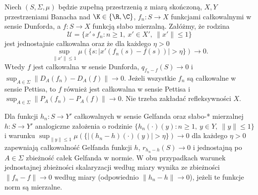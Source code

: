 \begin{twierdzenie}
\label{thm:uniform-vitali15b}
Niech $(S,\Sigma,\mu)$ będzie zupełną przestrzenią z miarą
skończoną, $X,Y$ przestrzeniami Banacha nad $\K\in\{\R,\C\}$,
$f_n:S\to X$ funkcjami całkowalnymi w sensie Dunforda,
a $f:S\to X$ funkcją słabo mierzalną. Załóżmy, że rodzina
\[
 \mathcal U=\{x'\circ f_n:n\ge1,\ x'\in X',\ \|x'\|\le1\}
\]
jest jednostajnie całkowalna oraz że dla każdego $\eta>0$
\[
 \sup_{\|x'\|\le1}
 \mu(\{s:|x'(f_n(s)-f(s))|>\eta\})\longrightarrow0.
\]
Wtedy $f$ jest całkowalna w sensie Dunforda,
$q_{f_n-f}(S)\to0$ i
$\sup_{A\in\Sigma}\|D_A(f_n)-D_A(f)\|\to0$.
Jeżeli wszystkie $f_n$ są całkowalne w sensie Pettisa,
to $f$ również jest całkowalna w sensie Pettisa i
$\sup_{A\in\Sigma}\|P_A(f_n)-P_A(f)\|\to0$.
Nie trzeba zakładać refleksywności $X$.

Dla funkcji $h_n:S\to Y'$ całkowalnych w sensie Gelfanda
oraz słabo-* mierzalnej $h:S\to Y'$ analogiczne założenia
o rodzinie $\{h_n(\cdot)(y):n\ge1,\ y\in Y,\ \|y\|\le1\}$ i
warunku $\sup_{\|y\|\le1}\mu(\{|(h_n-h)(\cdot)(y)|>\eta\})\to0$
dla każdego $\eta>0$ zapewniają całkowalność Gelfanda
funkcji $h$, $r_{h_n-h}(S)\to0$ i jednostajną po $A\in\Sigma$
zbieżność całek Gelfanda w normie.
W obu przypadkach warunek jednostajnej zbieżności skalaryzacji
według miary wynika ze zbieżności
$\|f_n-f\|\to0$ według miary (odpowiednio $\|h_n-h\|\to0$),
jeżeli te funkcje norm są mierzalne.
\end{twierdzenie}
